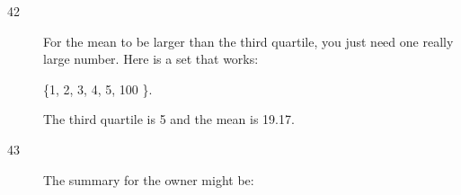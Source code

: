 \documentclass[letterpaper, landscape]{exam}
\begin{document}
\begin{description}
      \item[42]
        For the mean to be larger than the third quartile, you just need one
        really large number.  Here is a set that works: 
        
        \{1, 2, 3, 4, 5, 100 \}.  
        
        The third quartile is 5 and the mean is 19.17.

      \item[43]

        The summary for the owner might be:


\end{description}
\end{document}
